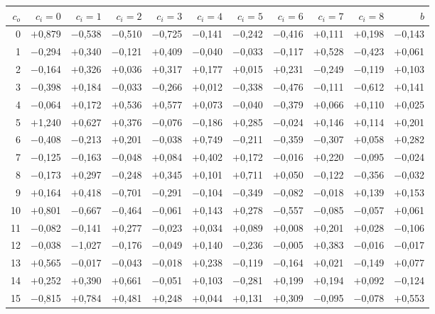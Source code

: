 \begin{tabular}{rrrrrrrrrrr}
\toprule
$c_o$ & $c_i{=}0$ & $c_i{=}1$ & $c_i{=}2$ & $c_i{=}3$ & $c_i{=}4$ & $c_i{=}5$ & $c_i{=}6$ & $c_i{=}7$ & $c_i{=}8$ & $b$ \\
\midrule
0 & $+$0,879 & $-$0,538 & $-$0,510 & $-$0,725 & $-$0,141 & $-$0,242 & $-$0,416 & $+$0,111 & $+$0,198 & $-$0,143 \\
1 & $-$0,294 & $+$0,340 & $-$0,121 & $+$0,409 & $-$0,040 & $-$0,033 & $-$0,117 & $+$0,528 & $-$0,423 & $+$0,061 \\
2 & $-$0,164 & $+$0,326 & $+$0,036 & $+$0,317 & $+$0,177 & $+$0,015 & $+$0,231 & $-$0,249 & $-$0,119 & $+$0,103 \\
3 & $-$0,398 & $+$0,184 & $-$0,033 & $-$0,266 & $+$0,012 & $-$0,338 & $-$0,476 & $-$0,111 & $-$0,612 & $+$0,141 \\
4 & $-$0,064 & $+$0,172 & $+$0,536 & $+$0,577 & $+$0,073 & $-$0,040 & $-$0,379 & $+$0,066 & $+$0,110 & $+$0,025 \\
5 & $+$1,240 & $+$0,627 & $+$0,376 & $-$0,076 & $-$0,186 & $+$0,285 & $-$0,024 & $+$0,146 & $+$0,114 & $+$0,201 \\
6 & $-$0,408 & $-$0,213 & $+$0,201 & $-$0,038 & $+$0,749 & $-$0,211 & $-$0,359 & $-$0,307 & $+$0,058 & $+$0,282 \\
7 & $-$0,125 & $-$0,163 & $-$0,048 & $+$0,084 & $+$0,402 & $+$0,172 & $-$0,016 & $+$0,220 & $-$0,095 & $-$0,024 \\
8 & $-$0,173 & $+$0,297 & $-$0,248 & $+$0,345 & $+$0,101 & $+$0,711 & $+$0,050 & $-$0,122 & $-$0,356 & $-$0,032 \\
9 & $+$0,164 & $+$0,418 & $-$0,701 & $-$0,291 & $-$0,104 & $-$0,349 & $-$0,082 & $-$0,018 & $+$0,139 & $+$0,153 \\
10 & $+$0,801 & $-$0,667 & $-$0,464 & $-$0,061 & $+$0,143 & $+$0,278 & $-$0,557 & $-$0,085 & $-$0,057 & $+$0,061 \\
11 & $-$0,082 & $-$0,141 & $+$0,277 & $-$0,023 & $+$0,034 & $+$0,089 & $+$0,008 & $+$0,201 & $+$0,028 & $-$0,106 \\
12 & $-$0,038 & $-$1,027 & $-$0,176 & $-$0,049 & $+$0,140 & $-$0,236 & $-$0,005 & $+$0,383 & $-$0,016 & $-$0,017 \\
13 & $+$0,565 & $-$0,017 & $-$0,043 & $-$0,018 & $+$0,238 & $-$0,119 & $-$0,164 & $+$0,021 & $-$0,149 & $+$0,077 \\
14 & $+$0,252 & $+$0,390 & $+$0,661 & $-$0,051 & $+$0,103 & $-$0,281 & $+$0,199 & $+$0,194 & $+$0,092 & $-$0,124 \\
15 & $-$0,815 & $+$0,784 & $+$0,481 & $+$0,248 & $+$0,044 & $+$0,131 & $+$0,309 & $-$0,095 & $-$0,078 & $+$0,553 \\

\end{tabular}
